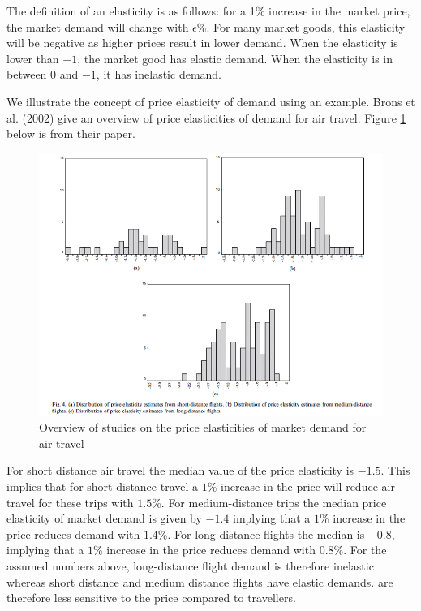 \documentclass[
]{book}
\begin{document}
The definition of an elasticity is as follows: for a 1\% increase in the market price, the market demand will change with \(\epsilon\)\%. For many market goods, this elasticity will be negative as higher prices result in lower demand. When the elasticity is lower than \(-1\), the market good has elastic demand. When the elasticity is in between 0 and \(-1\), it has inelastic demand.

We illustrate the concept of price elasticity of demand using an example. Brons et al. (2002) give an overview of price elasticities of demand for air travel. Figure \ref{fig:brons} below is from their paper.

\begin{figure}
\includegraphics[width=11.42in]{./figures/brons} \caption{Overview of studies on the price elasticities of market demand for air travel}\label{fig:brons}
\end{figure}

For short distance air travel the median value of the price elasticity is \(-1.5\). This implies that for short distance travel a \(1\)\% increase in the price will reduce air travel for these trips with \(1.5\)\%. For medium-distance trips the median price elasticity of market demand is given by \(-1.4\) implying that a \(1\)\% increase in the price reduces demand with \(1.4\)\%. For long-distance flights the median is \(-0.8\), implying that a \(1\)\% increase in the price reduces demand with \(0.8\)\%. For the assumed numbers above, long-distance flight demand is therefore inelastic whereas short distance and medium distance flights have elastic demands. are therefore less sensitive to the price compared to travellers.
\end{document}
